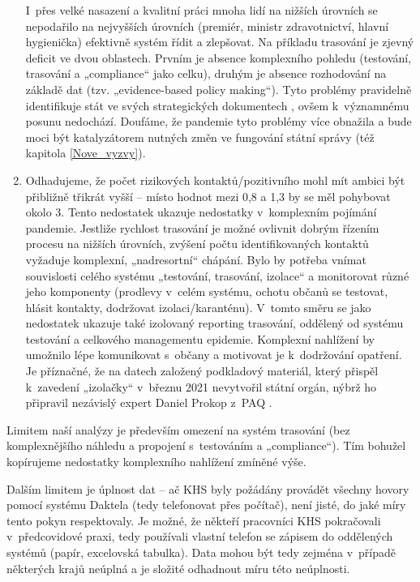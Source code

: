 \begin{enumerate}
I~přes velké nasazení a kvalitní práci mnoha lidí na nižších úrovních se nepodařilo na nejvyšších úrovních (premiér, ministr zdravotnictví, hlavní hygienička) efektivně systém řídit a zlepšovat. Na příkladu trasování je zjevný deficit ve dvou oblastech. Prvním je absence komplexního pohledu (testování, trasování a „compliance“ jako celku), druhým je absence rozhodování na základě dat (tzv. „evidence-based policy making“). Tyto problémy pravidelně identifikuje stát ve svých strategických dokumentech \cite{tr_MVCR, tr_MZP}, ovšem k~významnému posunu nedochází. Doufáme, že pandemie tyto problémy více obnažila a bude moci být katalyzátorem nutných změn ve fungování státní správy (též kapitola \ref{Nove_vyzvy}).
\item Odhadujeme, že počet rizikových kontaktů/pozitivního mohl mít ambici být přibližně třikrát vyšší -- místo hodnot mezi 0,8 a 1,3 by se měl pohybovat okolo 3. Tento nedostatek ukazuje nedostatky v~komplexním pojímání pandemie. Jestliže rychlost trasování je možné ovlivnit dobrým řízením procesu na nižších úrovních, zvýšení počtu identifikovaných kontaktů vyžaduje komplexní, „nadresortní“ chápání. Bylo by potřeba vnímat souvislosti celého systému „testování, trasování, izolace“ a monitorovat různé jeho komponenty (prodlevy v~celém systému, ochotu občanů se
testovat, hlásit kontakty, dodržovat izolaci/karanténu). V~tomto směru se jako nedostatek ukazuje také izolovaný reporting trasování, oddělený od systému testování a celkového managementu epidemie. Komplexní nahlížení by umožnilo
lépe komunikovat s~občany a motivovat je k~dodržování opatření. Je příznačné, že na datech založený podkladový materiál, který přispěl k~zavedení „izolačky“ \cite{tr_MPSV} v~březnu 2021 nevytvořil státní orgán, nýbrž ho připravil nezávislý expert Daniel Prokop z~PAQ \cite{tr_PAQ02}.
\end{enumerate}

Limitem naší analýzy je především omezení na systém trasování (bez komplexnějšího náhledu a propojení s~testováním a „compliance“). Tím bohužel ko\-pí\-ru\-je\-me nedostatky komplexního nahlížení zmíněné výše.

Dalším limitem je úplnost dat -- ač KHS byly požádány provádět všechny hovory pomocí systému Daktela (tedy telefonovat přes počítač), není jisté, do jaké míry tento pokyn respektovaly. Je možné, že někteří pracovníci KHS pokračovali v~předcovidové praxi, tedy používali vlastní telefon se zápisem do oddělených systémů (papír, excelovská tabulka). Data mohou být tedy zejména v~případě některých krajů neúplná a je složité odhadnout míru této neúplnosti.

